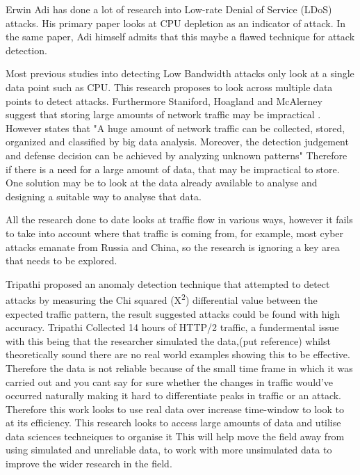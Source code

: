 Erwin Adi has done a lot of research into Low-rate Denial of Service (LDoS) attacks. His primary paper looks at CPU depletion as an indicator of attack. In the same paper, Adi himself admits that this maybe a flawed technique for attack detection. \cite{Adi2016} 

Most previous studies into detecting Low Bandwidth attacks only look at a single data point such as CPU. This research proposes to look across multiple data points to detect attacks. Furthermore Staniford, Hoagland and McAlerney suggest that storing large amounts of network traffic may be impractical \cite{staniford2002practical}. However \citeauthor{9016229} states that "A huge amount of network traffic can be collected, stored, organized and classified by big data analysis. Moreover, the detection judgement and defense decision can be achieved by analyzing unknown patterns" \cite{9016229} Therefore if there is a need for a large amount of data, that may be impractical to store. One solution may be to look at the data already available to analyse and designing a suitable way to analyse that data.

All the research done to date looks at traffic flow in various ways, however it fails to take into account where that traffic is coming from, for example, most cyber attacks emanate from Russia and China, so the research is ignoring a key area that needs to be explored.

Tripathi proposed an anomaly detection technique that attempted to detect attacks by measuring the Chi squared (X\textsuperscript{\small2}) differential value between the expected traffic pattern, the result suggested attacks could be found with high accuracy. Tripathi Collected 14 hours of HTTP/2 traffic, a fundermental issue with this being that the researcher simulated the data,(put reference) whilst theoretically sound there are no real world examples showing this to be effective. Therefore the data is not reliable because of the small time frame in which it was carried out and you cant say for sure whether the changes in traffic would've occurred naturally making it hard to differentiate peaks in traffic or an attack. Therefore this work looks to use real data over increase time-window to look to at its efficiency. This research looks to access large amounts of data and utilise data sciences techneiques to organise it This will help move the field away from using simulated and unreliable data, to work with more unsimulated data to improve the wider research in the field. 

